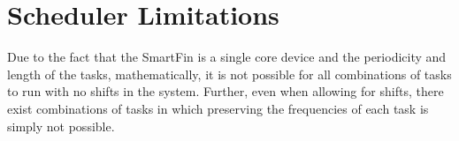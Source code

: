\documentclass{article}
\begin{document}
\section{Scheduler Limitations}
Due to the fact that the SmartFin is a single core device and the periodicity and length of the tasks, mathematically, it is not possible for all combinations of tasks to run with no shifts in the system. Further, even when allowing for shifts, there exist combinations of tasks in which preserving the frequencies of each task is simply not possible. 


{} 

\end{document}
